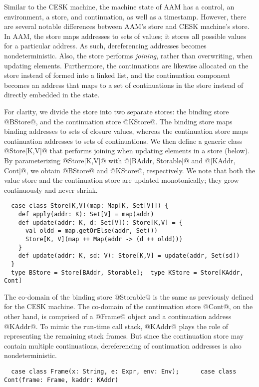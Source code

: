 \documentclass[acmsmall, review]{acmart}\settopmatter{}
\begin{document}
Similar to the CESK machine, the machine state of AAM has a control, an environment, a store,
and continuation, as well as a timestamp. However, there are several notable differences
between AAM's store and CESK machine's store. In AAM, the store maps addresses to sets of
values; it stores all possible values for a particular address. As such, dereferencing
addresses becomes nondeterministic. Also, the store performs \emph{joining}, rather than
overwriting, when updating elements. Furthermore, the continuations are likewise allocated
on the store instead of formed into a linked list, and the continuation component becomes
an address that maps to a set of continuations in the store instead of directly embedded
in the state.

For clarity, we divide the store into two separate stores: the binding store @BStore@, and
the continuation store @KStore@.
The binding store maps binding addresses to sets of closure values, whereas the continuation
store maps continuation addresses to sets of continuations.
We then define a generic class @Store[K,V]@ that performs joining when updating elements
in a store (below). By parameterizing @Store[K,V]@ with @[BAddr, Storable]@ and
@[KAddr, Cont]@, we obtain @BStore@ and @KStore@, respectively.
We note that both the value store and the continuation store are updated monotonically;
they grow continuously and never shrink.

\begin{lstlisting}
  case class Store[K,V](map: Map[K, Set[V]]) {
    def apply(addr: K): Set[V] = map(addr)
    def update(addr: K, d: Set[V]): Store[K,V] = {
      val oldd = map.getOrElse(addr, Set())
      Store[K, V](map ++ Map(addr -> (d ++ oldd)))
    }
    def update(addr: K, sd: V): Store[K,V] = update(addr, Set(sd))
  }
  type BStore = Store[BAddr, Storable];  type KStore = Store[KAddr, Cont]
\end{lstlisting}

The co-domain of the binding store @Storable@ is the same as previously defined for the CESK 
machine. The co-domain of the continuation store @Cont@, on the other hand, is comprised of
a @Frame@ object and a continuation address @KAddr@. To mimic the run-time call stack, 
@KAddr@ plays the role of representing the remaining stack frames.
But since the continuation store may contain multiple continuations, dereferencing 
of continuation addresses is also nondeterministic.

\begin{lstlisting}
  case class Frame(x: String, e: Expr, env: Env);      case class Cont(frame: Frame, kaddr: KAddr)
\end{lstlisting}
\end{document}
